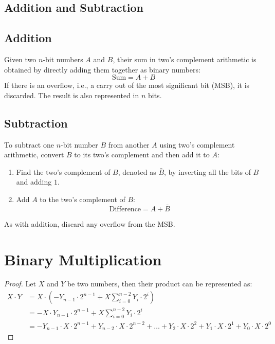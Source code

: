 \documentclass[12pt,openany, tikz,border=10pt]{book}
\begin{document}
		\subsection{Addition and Subtraction}
		\subsection{Addition}
		Given two \(n\)-bit numbers \(A\) and \(B\), their sum in two's complement arithmetic is obtained by directly adding them together as binary numbers:
		\begin{equation}
			\text{Sum} = A + B
		\end{equation}
		If there is an overflow, i.e., a carry out of the most significant bit (MSB), it is discarded. The result is also represented in \(n\) bits.
		
		\subsection{Subtraction}
		To subtract one \(n\)-bit number \(B\) from another \(A\) using two's complement arithmetic, convert \(B\) to its two's complement and then add it to \(A\):
		\begin{enumerate}
			\item Find the two's complement of \(B\), denoted as \(\bar{B}\), by inverting all the bits of \(B\) and adding \(1\).
			\item Add \(A\) to the two's complement of \(B\):
			      \begin{equation}
			      	\text{Difference} = A + \bar{B}
			      \end{equation}
		\end{enumerate}
		As with addition, discard any overflow from the MSB.
		
		
		\section{Binary Multiplication}
		
		\begin{proof}[Proof]
			Let $X$ and $Y$ be two numbers, then their product can be represented as:
			\begin{align*}
				X \cdot Y & = X \cdot \left( -Y_{n-1} \cdot 2^{n-1} + X \sum_{i=0}^{n-2} Y_i \cdot 2^i \right)                                                                \\
				          & = -X \cdot Y_{n-1} \cdot 2^{n-1} + X \sum_{i=0}^{n-2} Y_i \cdot 2^i                                                                               \\
				          & = -Y_{n-1} \cdot X \cdot 2^{n-1} + Y_{n-2} \cdot X \cdot 2^{n-2} + \ldots + Y_2 \cdot X \cdot 2^2 + Y_1 \cdot X \cdot 2^1 + Y_0 \cdot X \cdot 2^0 
			\end{align*}
		\end{proof}
		    
\end{document}
